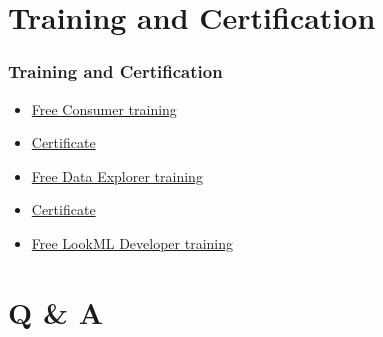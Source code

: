 \documentclass{beamer}
\begin{document}
\section{Training and Certification}


\begin{frame}
\frametitle{Training and Certification}
\begin{itemize}
\item<1-> \href{https://training.looker.com/looker-for-data-consumers}{Free Consumer training}
\item<1-> \href{https://verify.skilljar.com/c/3hki2a4qvgok}{Certificate}
\item<2-> \href{https://training.looker.com/looker-for-data-explorers}{Free Data Explorer training}
\item<2-> \href{https://verify.skilljar.com/c/em6yhniy2iee}{Certificate}
\item<3-> \href{https://training.looker.com/looker-development-foundations}{Free LookML Developer training}

\end{itemize}
\end{frame}

\section{Q \& A}
\end{document}

